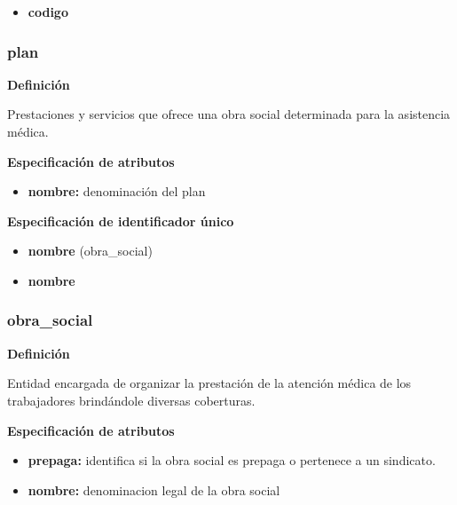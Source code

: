 \documentclass[a4paper,11pt]{article}
\begin{document}
\begin{itemize}

     \item \textbf{codigo}

\end{itemize}

\subsubsection{\textbf{plan}}

\textbf{Definición}

Prestaciones y servicios que ofrece una obra social determinada para la asistencia médica.

\textbf{Especificación de atributos}

\begin{itemize}

     \item \textbf{nombre:} denominación del plan

\end{itemize}

\textbf{Especificación de identificador único}

\begin{itemize}

     \item \textbf{nombre} (obra\_social)

     \item \textbf{nombre}

\end{itemize}

\subsubsection{\textbf{obra\_social}}

\textbf{Definición}

Entidad encargada de organizar la prestación de la atención médica de los 
trabajadores brindándole diversas coberturas.

\textbf{Especificación de atributos}

\begin{itemize}

     \item \textbf{prepaga:} identifica si la obra social es prepaga o pertenece a un sindicato.

     \item \textbf{nombre:} denominacion legal de la obra social

\end{itemize}
\end{document}
